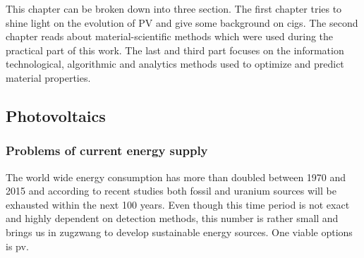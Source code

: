 This chapter can be broken down into three section. 
The first chapter tries to shine light on the evolution of PV and give some background on \gls{cigs}.
The second chapter reads about material-scientific methods which were used during the practical part of this work. 
The last and third part focuses on the information technological, algorithmic and analytics methods used to optimize and predict material properties. 

\subsection{Photovoltaics}
\subsubsection{Problems of current energy supply}
The world wide energy consumption has more than doubled between 1970 and 2015\cite{BP2017} 
and according to recent studies both fossil\cite{BGR2017} and uranium sources\cite{Uran2006} 
will be exhausted within the next 100 years. 
Even though this time period is not exact and highly dependent on detection methods, 
this number is rather small and brings us in zugzwang to develop sustainable energy sources. 
One viable options is \gls{pv}.

\iffalse
The basis for all pvs is the photovoltaik effect which was entdeckt by Albert Einstein adn for which he got the Nobel price. 
The Prinziple is easy: When the energy (E = hv) of the light is \td{large,strong,high}er 
than the binding energy of an electron the electron is ejected with the remaining energy as kinetic energy 
\begin{math}
	E_{kin}=hv - Eb
\end{math}
Different Materials have different binding energies. 
Metals do have in general lower binding energies than covalent bound material and semiconductors do have even lowers E_b. Really? 
That's Silica is in a lot of PVs. 
The next generation of PVs. 
CIGS has in contrast to silicon based PV a direct band gap\td{source and what does that mean?}
duennschicht pv, haben eine effeftivitaet von 7-16\% vs 15-22\% \cite{Mertens2018}
\fi
